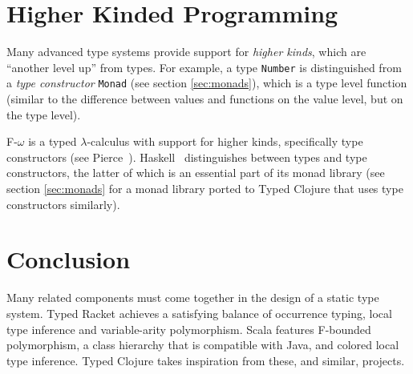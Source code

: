 \section{Higher Kinded Programming}

Many advanced type systems provide support for \emph{higher kinds},
which are ``another level up'' from types.
For example, a type \lstinline|Number| is distinguished from a
\emph{type constructor} \lstinline|Monad| (see section \ref{sec:monads}), which is a type level function
(similar to the difference between values and functions on the value level, but on the type level).

F-$\omega$ is a typed $\lambda$-calculus with support for higher kinds,
specifically type constructors (see Pierce~\cite{Pie02}).
Haskell~\cite{Mar10} distinguishes between types and type constructors,
the latter of which is an essential part of its monad library 
(see section \ref{sec:monads} for a monad library ported to Typed Clojure
that uses type constructors similarly).

\section{Conclusion}

Many related components must come together in the design of a
static type system. Typed Racket achieves a satisfying balance of 
occurrence typing, local type inference and variable-arity polymorphism.
Scala features F-bounded polymorphism, a class hierarchy
that is compatible with Java, and colored local type inference.
Typed Clojure takes inspiration from these, and similar, projects.
